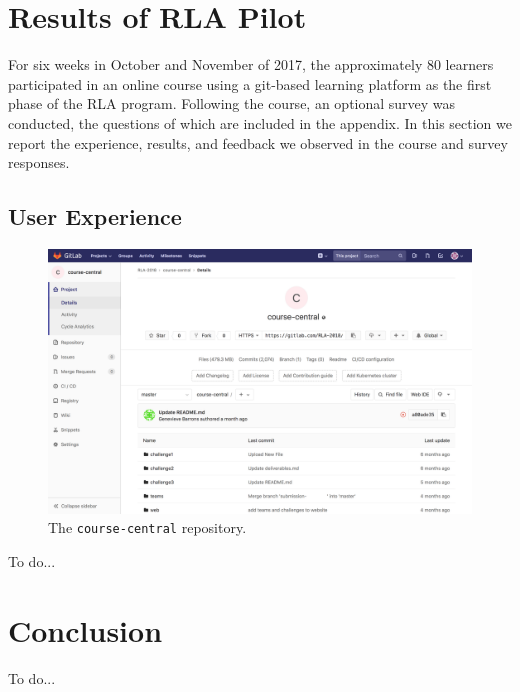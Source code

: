 \documentclass[12pt,twoside,vi]{mitthesis}
\newcommand{\wip}[1]{{\color{red} To do...}}
\begin{document}
\chapter{Results of RLA Pilot}

For six weeks in October and November of 2017, the approximately 80 learners participated in an online course using a git-based learning platform as the first phase of the RLA program. Following the course, an optional survey was conducted, the questions of which are included in the appendix. In this section we report the experience, results, and feedback we observed in the course and survey responses.

\section{User Experience}

\begin{figure}[H]
\centering
\includegraphics[scale=0.3]{fig-course-central.png}
\caption{The \texttt{course-central} repository.}
\end{figure}

\wip{Frame around tensions, for each broad set of interactions go over "what did it look like", "how did it work", and "how well did it work"}

\chapter{Conclusion}

\wip{narrative summary of thesis, an honest set of personal takeaways (from which reader can judge whether to replicate work) and feeligns about future work}

\appendix
\end{document}
